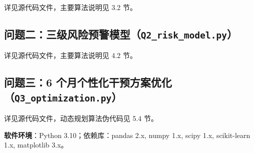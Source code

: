 \documentclass{MathorCupmodeling}
\begin{document}
详见源代码文件，主要算法说明见 3.2 节。

\subsection{\texorpdfstring{问题二：三级风险预警模型（\texttt{Q2\_risk\_model.py}）}{问题二：三级风险预警模型（Q2\_risk\_model.py）}}\label{a.2-ux95eeux9898ux4e8cux4e09ux7ea7ux98ceux9669ux9884ux8b66ux6a21ux578bq2_risk_model.py}

详见源代码文件，主要算法说明见 4.2 节。

\subsection{\texorpdfstring{问题三：6 个月个性化干预方案优化（\texttt{Q3\_optimization.py}）}{问题三：6 个月个性化干预方案优化（Q3\_optimization.py）}}\label{a.3-ux95eeux9898ux4e096-ux4e2aux6708ux4e2aux6027ux5316ux5e72ux9884ux65b9ux6848ux4f18ux5316q3_optimization.py}

详见源代码文件，动态规划算法伪代码见 5.4 节。

\textbf{软件环境}：Python 3.10；依赖库：pandas 2.x, numpy 1.x, scipy 1.x, scikit-learn 1.x, matplotlib 3.x。
\end{document}

